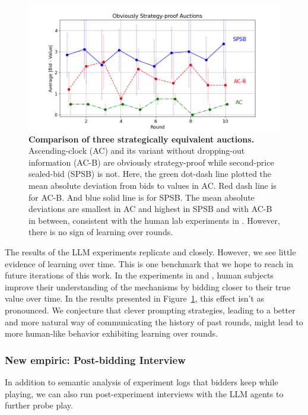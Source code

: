 \documentclass{article} %
\begin{document}
\begin{figure}[h]  
    \centering  
\includegraphics[width=\linewidth]{Figs/OSP.png}  
    \caption{\textbf{Comparison of three strategically equivalent auctions.} Ascending-clock (AC) and its variant without dropping-out information (AC-B) are obviously strategy-proof while second-price sealed-bid (SPSB) is not. Here, the green dot-dash line plotted the mean absolute deviation from bids to values in AC. Red dash line is for AC-B. And blue solid line is for SPSB. The mean absolute deviations are smallest in AC and highest in SPSB and with AC-B in between, consistent with the human lab experiments in \cite{breitmoser2022obviousness}. However, there is no sign of learning over rounds.}
    
    \label{fig:osp}
\end{figure}

The results of the LLM experiments replicate \cite{li2017obviously} and \citet{breitmoser2022obviousness} closely. However, we see little evidence of learning over time. This is one benchmark that we hope to reach in future iterations of this work. In the experiments in \citet{li2017obviously} and \citet{breitmoser2022obviousness}, human subjects improve their understanding of the mechanisms by bidding closer to their true value over time. In the results presented in Figure~\ref{fig:osp}, this effect isn't as pronounced. We conjecture that clever prompting strategies, leading to a better and more natural way of communicating the history of past rounds, might lead to more human-like behavior exhibiting learning over rounds.

\subsubsection{New empiric: Post-bidding Interview}

In addition to semantic analysis of experiment logs that bidders keep while playing, we can also run post-experiment interviews with the LLM agents to further probe play.
\end{document}
